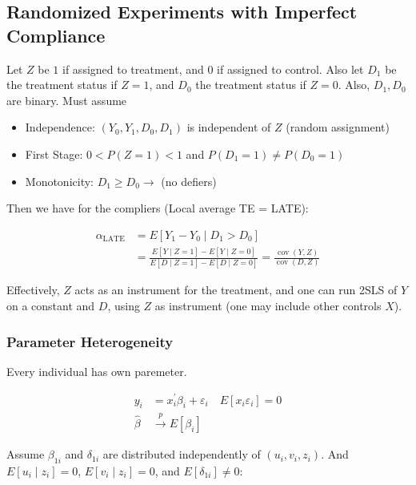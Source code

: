 \subsection{Randomized Experiments with Imperfect Compliance}

Let $Z$ be $1$ if assigned to treatment, and $0$ if assigned to control. Also let $D_1$ be the treatment status if $Z=1$, and $D_0$ the treatment status if $Z=0$. Also, $D_1, D_0$ are binary. Must assume 

\begin{itemize}
    \item Independence: $\left(Y_0, Y_1, D_0, D_1\right)$ is independent of $Z$ (random assignment)
    \item First Stage: $0<P(Z=1)<1$ and $P\left(D_1=1\right) \neq P\left(D_0=1\right)$
    \item Monotonicity: $D_1 \geq D_0 \longrightarrow$ (no defiers)
\end{itemize}

Then we have for the compliers (Local average TE = LATE):

\begin{align*}
    \alpha_\text{LATE} &= E\left[Y_1-Y_0 \mid D_1>D_0\right] \\
    &= \frac{E[Y \mid Z=1]-E[Y \mid Z=0]}{E[D \mid Z=1]-E[D \mid Z=0]}=\frac{\operatorname{cov}(Y, Z)}{\operatorname{cov}(D, Z)}
\end{align*}

Effectively, $Z$ acts as an instrument for the treatment, and one can run 2SLS of $Y$ on a constant and $D$, using $Z$ as instrument (one may include other controls $X$).

\subsubsection{Parameter Heterogeneity}

Every individual has own paremeter.

\begin{align*}
    y_i &= x_i^{\prime} \beta_i+\varepsilon_i \quad E\left[x_i \varepsilon_i\right]=0 \\
    \widehat{\beta} & \stackrel{p}{\longrightarrow} E\left[\beta_i\right]
\end{align*}

Assume $\beta_{1 i}$ and $\delta_{1 i}$ are distributed independently of $\left(u_i, v_i, z_i\right)$. And $E\left[u_i \mid z_i\right]=0$, $E\left[v_i \mid z_i\right]=0$, and $E\left[\delta_{1 i}\right] \neq 0$:


